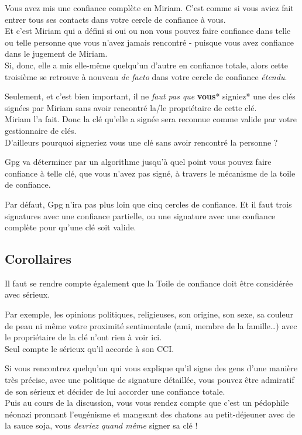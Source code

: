 Vous avez mis une confiance complète en Miriam. C'est comme si vous
aviez fait entrer tous ses contacts dans votre cercle de confiance à
vous.\\Et c'est Miriam qui a défini si oui ou non vous pouvez faire
confiance dans telle ou telle personne que vous n'avez jamais rencontré
- puisque vous avez confiance dans le jugement de Miriam.\\Si, donc,
elle a mis elle-même quelqu'un d'autre en confiance totale, alors cette
troisième se retrouve à nouveau \emph{de facto} dans votre cercle de
confiance \emph{étendu}.

Seulement, et c'est bien important, il ne \emph{faut pas que
}\textbf{vous}* signiez* une des clés signées par Miriam sans avoir
rencontré la/le propriétaire de cette clé.\\Miriam l'a fait. Donc la clé
qu'elle a signée sera reconnue comme valide par votre gestionnaire de
clés.\\D'ailleurs pourquoi signeriez vous une clé sans avoir rencontré
la personne ?

Gpg va déterminer par un algorithme jusqu'à quel point vous pouvez faire
confiance à telle clé, que vous n'avez pas signé, à travers le mécanisme
de la toile de confiance.

Par défaut, Gpg n'ira pas plus loin que cinq cercles de confiance. Et il
faut trois signatures avec une confiance partielle, ou une signature
avec une confiance complète pour qu'une clé soit valide.

\subsection{Corollaires}\label{corollaires}

Il faut se rendre compte également que la Toile de confiance doit être
considérée avec sérieux.

Par exemple, les opinions politiques, religieuses, son origine, son
sexe, sa couleur de peau ni même votre proximité sentimentale (ami,
membre de la famille\ldots{}) avec le propriétaire de la clé n'ont rien
à voir ici.\\Seul compte le sérieux qu'il accorde à son CCI.

Si vous rencontrez quelqu'un qui vous explique qu'il signe des gens
d'une manière très précise, avec une politique de signature détaillée,
vous pouvez être admiratif de son sérieux et décider de lui accorder une
confiance totale.\\Puis au cours de la discussion, vous vous rendez
compte que c'est un pédophile néonazi pronnant l'eugénisme et mangeant
des chatons au petit-déjeuner avec de la sauce soja, vous \emph{devriez
quand même} signer sa clé !

